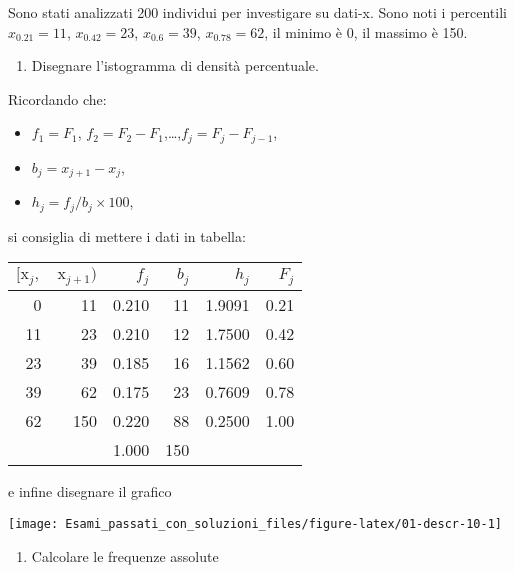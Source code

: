 \documentclass[
  11pt,
]{book}
\providecommand{\tightlist}{%
  \setlength{\itemsep}{0pt}\setlength{\parskip}{0pt}}
\theoremstyle{mytheoremstyle}
\theoremstyle{mydefstyle}
\newenvironment{sol}
  {
  \begin{tcolorbox}[enhanced,breakable,arc=0.1mm,boxrule=1pt,colback=white,colframe=iblue,
  title=\bf \fontfamily{lmss}\selectfont \hspace{.5 cm} Soluzione,drop fuzzy shadow]

}{
\end{tcolorbox}
  }
\begin{document}
Sono stati analizzati 200 individui per investigare su dati-x. Sono noti i percentili
\(x_{0.21}=11\), \(x_{0.42}=23\), \(x_{0.6}=39\), \(x_{0.78}=62\), il minimo è 0, il massimo è 150.

\begin{enumerate}
\def\labelenumi{\alph{enumi}.}
\tightlist
\item
  Disegnare l'istogramma di densità percentuale.
\end{enumerate}

\begin{sol}

Ricordando che:

\begin{itemize}
\tightlist
\item
  \(f_1=F_1\), \(f_2=F_2-F_1\),\ldots,\(f_j = F_j-F_{j-1}\),
\item
  \(b_j=x_{j+1}-x_{j}\),
\item
  \(h_j=f_j/b_j\times 100\),
\end{itemize}

si consiglia di mettere i dati in tabella:

\begin{table}[H]
\centering
\begin{tabular}{rrrrrr}
\toprule
$[\text{x}_j,$ & $\text{x}_{j+1})$ & $f_j$ & $b_j$ & $h_j$ & $F_j$\\
\midrule
0 & 11 & 0.210 & 11 & 1.9091 & 0.21\\
11 & 23 & 0.210 & 12 & 1.7500 & 0.42\\
23 & 39 & 0.185 & 16 & 1.1562 & 0.60\\
39 & 62 & 0.175 & 23 & 0.7609 & 0.78\\
62 & 150 & 0.220 & 88 & 0.2500 & 1.00\\
 &  & 1.000 & 150 &  & \\
\bottomrule
\end{tabular}
\end{table}

e infine disegnare il grafico

\begin{center}\texttt{[image: Esami\_passati\_con\_soluzioni\_files/figure-latex/01-descr-10-1]} \end{center}

\end{sol}

\begin{enumerate}
\def\labelenumi{\alph{enumi}.}
\setcounter{enumi}{1}
\tightlist
\item
  Calcolare le frequenze assolute
\end{enumerate}
\end{document}
